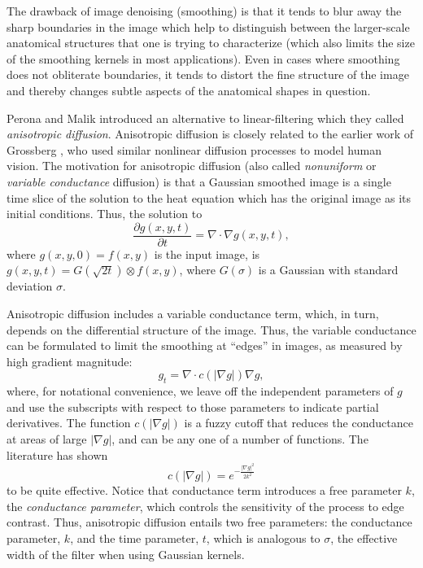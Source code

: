 %
%
%
%

The drawback of image denoising (smoothing) is that it tends to blur away the
sharp boundaries in the image which help to distinguish between the
larger-scale anatomical structures that one is trying to characterize (which
also limits the size of the smoothing kernels in most applications).  Even in
cases where smoothing does not obliterate boundaries, it tends to distort the
fine structure of the image and thereby changes subtle aspects of the
anatomical shapes in question.

Perona and Malik \cite{Perona1990} introduced an alternative to
linear-filtering which they called \emph{anisotropic diffusion}.  Anisotropic
diffusion is closely related to the earlier work of Grossberg
\cite{Grossberg1984}, who used similar nonlinear diffusion processes to model
human vision.  The motivation for anisotropic diffusion (also called
\emph{nonuniform} or \emph{variable conductance} diffusion) is that a Gaussian
smoothed image is a single time slice of the solution to the heat equation
which has the original image as its initial conditions.  Thus, the solution to
\begin{equation} \frac{\partial g(x, y, t) }{\partial t} = \nabla \cdot \nabla
g(x, y, t), \end{equation} where $g(x, y, 0) = f(x, y)$ is the input image, is
$g(x, y, t) = G(\sqrt{2t}) \otimes f(x, y)$, where $G(\sigma)$ is a Gaussian
with standard deviation $\sigma$.  

Anisotropic diffusion includes a variable conductance term, which, in turn,
depends on the differential structure of the image.  Thus, the variable
conductance can be formulated to limit the smoothing at ``edges'' in images, as
measured by high gradient magnitude: \begin{equation} g_{t} = \nabla \cdot
c(\left| \nabla g \right|) \nabla g, \label{eq:aniso} \end{equation} where, for
notational convenience, we leave off the independent parameters of $g$ and use
the subscripts with respect to those parameters to indicate partial
derivatives.  The function $c(|\nabla g|)$ is a fuzzy cutoff that reduces the
conductance at areas of large $|\nabla g|$, and can be any one of a number of
functions.  The literature has shown \begin{equation} c(|\nabla g|) =
e^{-\frac{|\nabla g|^{2}}{2k^{2}}} \end{equation} to be quite effective.
Notice that conductance term introduces a free parameter $k$, the {\em
conductance parameter}, which controls the sensitivity of the process to edge
contrast.  Thus, anisotropic diffusion entails two free parameters: the
conductance parameter, $k$, and the time parameter, $t$, which is analogous to
$\sigma$, the effective width of the filter when using Gaussian kernels.

